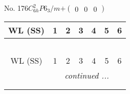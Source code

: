 \documentclass[fleqn,9pt,landscape]{jsarticle}
\begin{document}
\newpage
No. 176\quad$C_{6h}^{2}$\quad$P6_3/m$\quad[ hexagonal ]\quad$+\begin{pmatrix} 0 & 0 & 0 \end{pmatrix}$
\begin{center}
\renewcommand{\arraystretch}{1.2}
\begin{longtable}{ccccccc}
 \hline \hline
WL (SS) & 1 & 2 & 3 & 4 & 5 & 6 \\ \hline \endfirsthead

\multicolumn{6}{l}{\tablename\ \thetable{}} \\
 \hline \hline
WL (SS) & 1 & 2 & 3 & 4 & 5 & 6 \\ \hline \endhead

 \hline \hline
\multicolumn{6}{r}{\footnotesize\it continued ...} \\ \endfoot

 \hline \hline
\multicolumn{6}{r}{} \\ \endlastfoot


\end{longtable}
\end{center}
\end{document}
